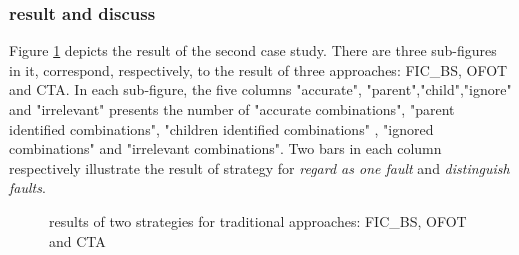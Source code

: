 \documentclass{sig-alternate}
\begin{document}
\subsubsection{result and discuss}
Figure \ref{fig:normalexperiment} depicts the result of the second case study. There are three sub-figures in it, correspond, respectively, to the result of three approaches: FIC\_BS, OFOT and CTA. In each sub-figure, the five columns "accurate", "parent","child","ignore" and "irrelevant" presents the number of "accurate combinations", "parent identified combinations", "children identified combinations" , "ignored combinations" and "irrelevant combinations". Two bars in each column respectively illustrate the result of strategy for \emph{regard as one fault} and \emph{distinguish faults}.

\begin{figure}[ht]
\centering
{}
\caption[]{results of two strategies for traditional approaches: FIC\_BS, OFOT and CTA}
\label{fig:normalexperiment}
\end{figure}
\end{document}
